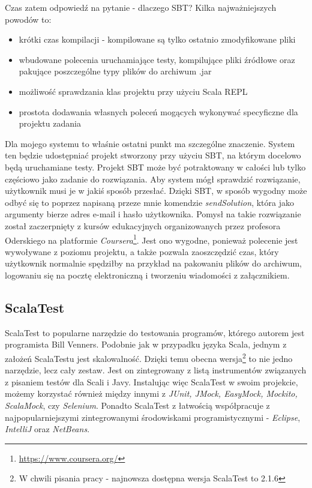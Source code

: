 \documentclass[brudnopis]{xmgr}
\begin{document}
Czas zatem odpowiedź na pytanie - dlaczego SBT? Kilka najważniejszych powodów to:
\begin{itemize}
\item krótki czas kompilacji - kompilowane są tylko ostatnio zmodyfikowane pliki
\item wbudowane polecenia uruchamiające testy, kompilujące pliki źródłowe oraz pakujące poszczególne typy plików do archiwum .jar
\item możliwość sprawdzania klas projektu przy użyciu Scala REPL
\item prostota dodawania własnych poleceń mogących wykonywać specyficzne dla projektu zadania   
\end{itemize}

Dla mojego systemu to właśnie ostatni punkt ma szczególne znaczenie. System ten będzie udostępniać projekt stworzony przy użyciu SBT, na którym docelowo będą uruchamiane testy. Projekt SBT może być potraktowany w całości lub tylko częściowo jako zadanie do rozwiązania. Aby system mógł sprawdzić rozwiązanie, użytkownik musi je w jakiś sposób przesłać. Dzięki SBT, w sposób wygodny może odbyć się to poprzez napisaną przeze mnie komendzie \emph{sendSolution}, która jako argumenty bierze adres e-mail i hasło użytkownika. Pomysł na takie rozwiązanie został zaczerpnięty z kursów edukacyjnych organizowanych przez profesora Oderskiego na platformie \textit{Coursera}\footnote{\url{https://www.coursera.org/}}. Jest ono wygodne, ponieważ polecenie jest wywoływane z poziomu projektu, a także pozwala zaoszczędzić czas, który użytkownik normalnie spędziłby na przykład na pakowaniu plików do archiwum, logowaniu się na pocztę elektroniczną i tworzeniu wiadomości z załącznikiem.

\subsection{ScalaTest}

\label{scalaTestSrodek} 

ScalaTest to popularne narzędzie do testowania programów, którego autorem jest programista Bill Venners. Podobnie jak w przypadku języka Scala, jednym z założeń ScalaTestu jest skalowalność. Dzięki temu obecna wersja\footnote{W chwili pisania pracy - najnowsza dostępna wersja ScalaTest to 2.1.6} to nie jedno narzędzie, lecz cały zestaw. Jest on zintegrowany z listą instrumentów związanych z pisaniem testów dla Scali i Javy. Instalując więc ScalaTest w swoim projekcie, możemy korzystać również między innymi z \textit{JUnit, JMock, EasyMock, Mockito, ScalaMock}, czy \textit{Selenium}. Ponadto ScalaTest z łatwością współpracuje z najpopularniejszymi zintegrowanymi środowiskami programistycznymi - \textit{Eclipse}, \textit{IntelliJ} oraz \textit{NetBeans}.
\end{document}
